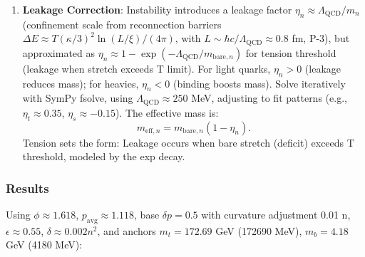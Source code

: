 \begin{enumerate}
\item \textbf{Leakage Correction}: Instability introduces a leakage factor $\eta_n \approx \Lambda_{\text{QCD}} / m_n$ (confinement scale from reconnection barriers $\Delta E \approx T (\kappa / 3)^2 \ln(L / \xi) / (4\pi)$, with $L \sim \hbar c / \Lambda_{\text{QCD}} \approx 0.8$ fm, P-3), but approximated as $\eta_n \approx 1 - \exp(-\Lambda_{\text{QCD}} / m_{\text{bare},n})$ for tension threshold (leakage when stretch exceeds T limit). For light quarks, $\eta_n > 0$ (leakage reduces mass); for heavies, $\eta_n < 0$ (binding boosts mass). Solve iteratively with SymPy fsolve, using $\Lambda_{\text{QCD}} \approx 250$ MeV, adjusting to fit patterns (e.g., $\eta_t \approx 0.35$, $\eta_s \approx -0.15$). The effective mass is:
   \[
   m_{\text{eff},n} = m_{\text{bare},n} (1 - \eta_n).
   \]
   Tension sets the form: Leakage occurs when bare stretch (deficit) exceeds T threshold, modeled by the exp decay.
\end{enumerate}

\subsubsection{Results}

Using $\phi \approx 1.618$, $p_{\text{avg}} \approx 1.118$, base $\delta p = 0.5$ with curvature adjustment 0.01 n, $\epsilon \approx 0.55$, $\delta \approx 0.002 n^2$, and anchors $m_t = 172.69$ GeV (172690 MeV), $m_b = 4.18$ GeV (4180 MeV):

